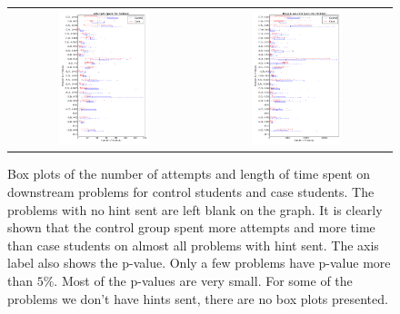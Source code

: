 \documentclass{llncs2e/llncs}
\begin{document}
\begin{figure}[ht]
  \centering
  \begin{tabular}{c c}
  \includegraphics[width=0.5\textwidth]{image/problem_tries_downstream.png} & 
  \includegraphics[width=0.5\textwidth]{image/problem_time_downstream.png}
  \end{tabular}
  \caption{Box plots of the number of attempts and length of time spent on downstream problems for control students and case students. The problems with no hint sent are left blank on the graph. It is clearly shown that the control group spent more attempts and more time than case students on almost all problems with hint sent. The axis label also shows the p-value. Only a few problems have p-value more than $5\%$. Most of the p-values are very small. For some of the problems we don't have hints sent, there are no box plots presented.}
   \label{fig:prob_tries_analysis}
\end{figure}
\end{document}
